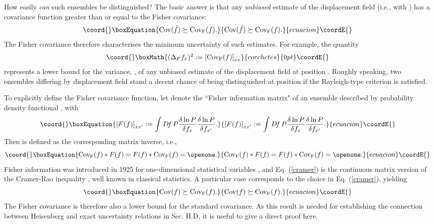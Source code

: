 \documentclass[a4paper,preprint, showpacs, aps, draft]{revtex4}
\begin{document}
{How easily {\it can} such ensembles be distinguished? 
The basic answer is that 
any {\it unbiased} estimate \coordHE{} of the displacement 
field (i.e., with \coordHE{}) has a
covariance function greater than or equal to the Fisher covariance:
\begin{equation}\coord{}\boxEquation{ \label{cramer}
{\rm Cov}({\tilde{f}}) \succeq {\rm Cov_F}(f) .
}{ {\rm Cov}({\tilde{f}}) \succeq {\rm Cov_F}(f) .
}{ecuacion}\coordE{}\end{equation}
The Fisher covariance therefore characterises the minimum uncertainty of such
estimates.  For example, the quantity 
\[\coord{}\boxMath{
(\Delta_F f_x)^2 := \left[{\rm Cov_F}(f)\right]_{xx} }{corchetes}{0pt}\coordE{}\]
represents 
a lower bound for the variance, \coordHE{}, of any unbiased
estimate of the displacement field at position \coordHE{}.
Roughly speaking, two ensembles differing by displacement field
\coordHE{} stand a decent chance of being distinguished 
at position \coordHE{} if the Rayleigh-type criterion
\coordHE{} is satisfied.

To explicitly define the Fisher covariance function, let \coordHE{}
denote the ``Fisher information matrix" of an ensemble described by
probability density functional \coordHE{} \cite{cover, cramer}, with
\begin{equation}\coord{}\boxEquation{ \label{fishmat}
\left[ F(f)\right]_{x x'} := \int D\! f\, P \frac{\delta\ln P}{\delta f_x} 
\frac{\delta\ln P}{\delta f_{x'}}.
}{ \left[ F(f)\right]_{x x'} := \int D\! f\, P \frac{\delta\ln P}{\delta f_x} 
\frac{\delta\ln P}{\delta f_{x'}}.
}{ecuacion}\coordE{}\end{equation}
Then \coordHE{} is defined as the corresponding matrix inverse,
i.e.,
\begin{equation}\coord{}\boxEquation{  \label{finv}
{\rm Cov_F}(f)\ast F(f) = F(f) \ast {\rm Cov_F}(f) = \openone .
}{  {\rm Cov_F}(f)\ast F(f) = F(f) \ast {\rm Cov_F}(f) = \openone .
}{ecuacion}\coordE{}\end{equation}
Fisher information was introduced in 1925 for one-dimensional
statistical variables \cite{fish}, and Eq. (\ref{cramer}) 
is the continuous matrix version of the 
Cramer-Rao inequality \cite{cramer}, well known in classical statistics.
A particular case corresponds to the choice
\coordHE{} in Eq. (\ref{cramer}), yielding
\begin{equation}\coord{}\boxEquation{ \label{fcramer}
{\rm Cov}(f)\succeq{\rm Cov_F}(f) . 
}{ {\rm Cov}(f)\succeq{\rm Cov_F}(f) . 
}{ecuacion}\coordE{}\end{equation}
The Fisher covariance is therefore also a lower bound for the standard
covariance.  As this result is needed for establishing the connection
between Heisenberg and exact uncertainty relations in Sec. II.D, it
is useful to give a direct proof here.

}
\end{document}
